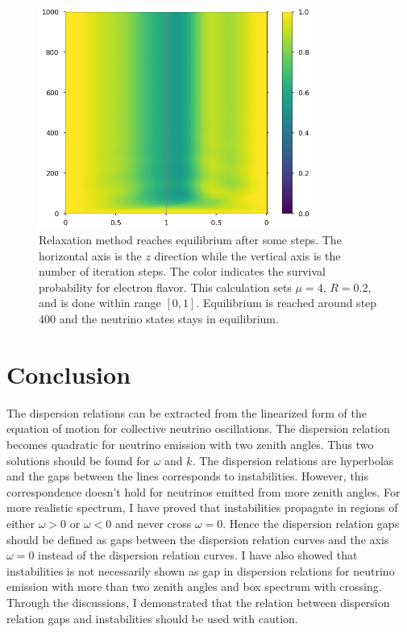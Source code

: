 \begin{figure}[htbp]
    \centering
    \includegraphics[width=0.8\textwidth]{chapters/assets/halo/relax-color.png}
    \caption{Relaxation method reaches equilibrium after some steps. The horizontal axis is the $z$ direction while the vertical axis is the number of iteration steps. The color indicates the survival probability for electron flavor. This calculation sets $\mu = 4$, $R=0.2$, and is done within range $[0,1]$. Equilibrium is reached around step 400 and the neutrino states stays in equilibrium.}
    \label{chap:halo-sec:num-fig:relax-color}
\end{figure}







\section{\label{chap:collective-sec:conclusion}Conclusion}


The dispersion relations can be extracted from the linearized form of the equation of motion for collective neutrino oscillations. The dispersion relation becomes quadratic for neutrino emission with two zenith angles. Thus two solutions should be found for $\omega$ and $k$. The dispersion relations are hyperbolas and the gaps between the lines corresponds to instabilities. However, this correspondence doesn't hold for neutrinos emitted from more zenith angles. For more realistic spectrum, I have proved that instabilities propagate in regions of either $\omega>0$ or $\omega<0$ and never cross $\omega=0$. Hence the dispersion relation gaps should be defined as gaps between the dispersion relation curves and the axis $\omega=0$ instead of the dispersion relation curves. I have also showed that instabilities is not necessarily shown as gap in dispersion relations for neutrino emission with more than two zenith angles and box spectrum with crossing. Through the discussions, I demonstrated that the relation between dispersion relation gaps and instabilities should be used with caution.


